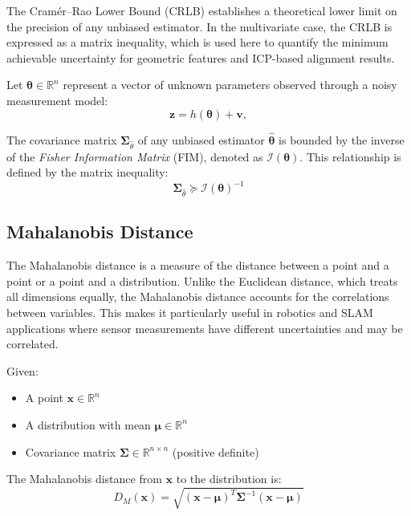 \documentclass[11pt]{article}
\begin{document}
The Cramér–Rao Lower Bound (CRLB) establishes a theoretical lower limit on the precision of any unbiased estimator. In the multivariate case, the CRLB is expressed as a matrix inequality, which is used here to quantify the minimum achievable uncertainty for geometric features and ICP-based alignment results.

Let $\mathbf{\theta} \in \mathbb{R}^n$ represent a vector of unknown parameters observed through a noisy measurement model:
\begin{equation}
	\mathbf{z} = h(\mathbf{\theta}) + \mathbf{v}, 
\end{equation}

The covariance matrix $\mathbf{\Sigma}_{\hat{\theta}}$ of any unbiased estimator $\mathbf{\hat{\theta}}$ is bounded by the inverse of the \textit{Fisher Information Matrix} (FIM), denoted as $\mathcal{I}(\mathbf{\theta})$. This relationship is defined by the matrix inequality:
\begin{equation}
	\mathbf{\Sigma}_{\hat{\theta}} \succeq \mathcal{I}(\mathbf{\theta})^{-1}
\end{equation}

\subsection{Mahalanobis Distance}


The Mahalanobis distance is a measure of the distance between a point and a point or a point and a distribution. Unlike the Euclidean distance, which treats all dimensions equally, the Mahalanobis distance accounts for the correlations between variables. This makes it particularly useful in robotics and SLAM applications where sensor measurements have different uncertainties and may be correlated.

Given:
\begin{itemize}
	\item A point $\mathbf{x} \in \mathbb{R}^n$
	\item A distribution with mean $\boldsymbol{\mu} \in \mathbb{R}^n$
	\item Covariance matrix $\boldsymbol{\Sigma} \in \mathbb{R}^{n \times n}$ (positive definite)
\end{itemize}

The Mahalanobis distance from $\mathbf{x}$ to the distribution is:
\begin{equation}
	D_M(\mathbf{x}) = \sqrt{(\mathbf{x} - \boldsymbol{\mu})^T \boldsymbol{\Sigma}^{-1} (\mathbf{x} - \boldsymbol{\mu})}
\end{equation}
\end{document}
